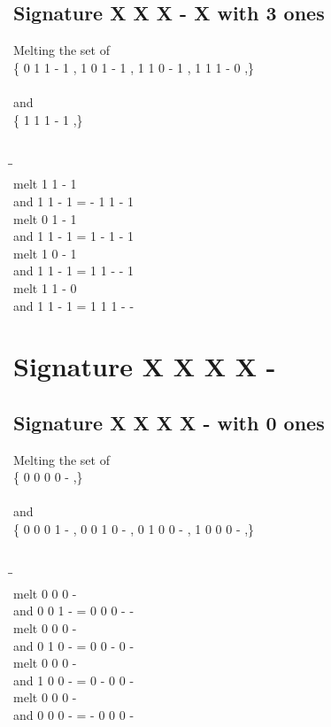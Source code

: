 \documentclass{article}
\begin{document}
\subsection{Signature X X X - X with 3 ones}
Melting the set of\\
\{ 0  1  1  -  1 , 1  0  1  -  1 , 1  1  0  -  1 , 1  1  1  -  0 ,\}\\\\
and\\
\{ 1  1  1  -  1 ,\}\\\\
\begin{tabbing}
\hspace{3cm}\=\hspace{3cm}\=\hspace{3cm}\\[1cm]
melt  1  1  -  1 \\
and  1  1  -  1 \>
 =  -  1  1  -  1 \\[1mm]
melt  0  1  -  1 \\
and  1  1  -  1 \>
 =  1  -  1  -  1 \\[1mm]
melt  1  0  -  1 \\
and  1  1  -  1 \>
 =  1  1  -  -  1 \\[1mm]
melt  1  1  -  0 \\
and  1  1  -  1 \>
 =  1  1  1  -  - \\[1mm]
\end{tabbing}
\newpage
\section{Signature X X X X - }
\subsection{Signature X X X X - with 0 ones}
Melting the set of\\
\{ 0  0  0  0  - ,\}\\\\
and\\
\{ 0  0  0  1  - , 0  0  1  0  - , 0  1  0  0  - , 1  0  0  0  - ,\}\\\\
\begin{tabbing}
\hspace{3cm}\=\hspace{3cm}\=\hspace{3cm}\\[1cm]
melt  0  0  0  - \\
and  0  0  1  - \>
 =  0  0  0  -  - \\[1mm]
melt  0  0  0  - \\
and  0  1  0  - \>
 =  0  0  -  0  - \\[1mm]
melt  0  0  0  - \\
and  1  0  0  - \>
 =  0  -  0  0  - \\[1mm]
melt  0  0  0  - \\
and  0  0  0  - \>
 =  -  0  0  0  - \\[1mm]
\end{tabbing}
\newpage
\end{document}
